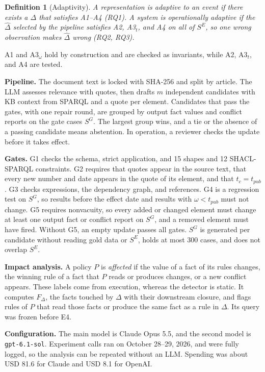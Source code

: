 \documentclass[conference]{IEEEtran}
\newtheorem{definition}{Definition}
\newcommand{\SG}{S^{G}}
\newcommand{\SE}{S^{E}}
\begin{document}
\begin{definition}[Adaptivity]
\label{def:adapt}
A representation is adaptive to an event if there \emph{exists} a $\Delta$ that satisfies A1--A4 (RQ1). A system is operationally adaptive if the $\hat{\Delta}$ \emph{selected by the pipeline} satisfies A2, A3$_t$, and A4 on all of $\SE$, so one wrong observation makes $\hat{\Delta}$ wrong (RQ2, RQ3).
\end{definition}

A1 and A3$_\omega$ hold by construction and are checked as invariants, while A2, A3$_t$, and A4 are tested.

\textbf{Pipeline.} The document text is locked with SHA-256 and split by article. The LLM assesses relevance with quotes, then drafts $m$ independent candidates with KB context from SPARQL and a quote per element. Candidates that pass the gates, with one repair round, are grouped by output fact values and conflict reports on the gate cases $\SG$. The largest group wins, and a tie or the absence of a passing candidate means abstention. In operation, a reviewer checks the update before it takes effect.

\textbf{Gates.} G1 checks the schema, strict application, and 15 shapes and 12 SHACL-SPARQL constraints. G2 requires that quotes appear in the source text, that every new number and date appears in the quote of its element, and that $t_c = t_{\mathit{pub}}$. G3 checks expressions, the dependency graph, and references. G4 is a regression test on $\SG$, so results before the effect date and results with $\omega < t_{\mathit{pub}}$ must not change. G5 requires nonvacuity, so every added or changed element must change at least one output fact or conflict report on $\SG$, and a removed element must have fired. Without G5, an empty update passes all gates. $\SG$ is generated per candidate without reading gold data or $\SE$, holds at most 300 cases, and does not overlap $\SE$.

\textbf{Impact analysis.} A policy $P$ is \emph{affected} if the value of a fact of its rules changes, the winning rule of a fact that $P$ reads or produces changes, or a new conflict appears. These labels come from execution, whereas the detector is static. It computes $F_\Delta$, the facts touched by $\Delta$ with their downstream closure, and flags rules of $P$ that read those facts or produce the same fact as a rule in $\Delta$. Its query was frozen before E4.

\textbf{Configuration.} The main model is Claude Opus 5.5, and the second model is \texttt{gpt-6.1-sol}. Experiment calls ran on October 28--29, 2026, and were fully logged, so the analysis can be repeated without an LLM. Spending was about USD 81.6 for Claude and USD 8.1 for OpenAI.
\end{document}
